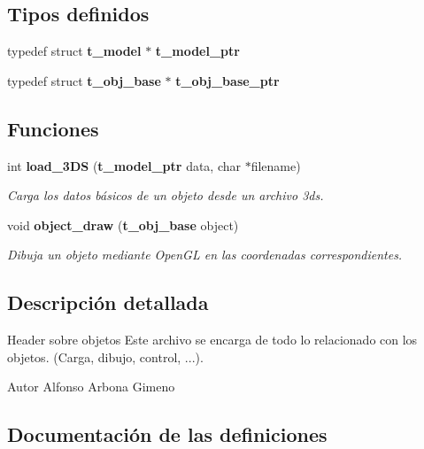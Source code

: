 \subsection*{Tipos definidos}
\begin{DoxyCompactItemize}
\item 
typedef struct {\bf t\_\-model} $\ast$ {\bfseries t\_\-model\_\-ptr}\label{objetos_8h_a6108708a375b94261d76f8f0bf603b79}

\item 
typedef struct {\bf t\_\-obj\_\-base} $\ast$ {\bfseries t\_\-obj\_\-base\_\-ptr}\label{objetos_8h_ab9022bdf7383ef095d59a852a3bd78c2}

\end{DoxyCompactItemize}
\subsection*{Funciones}
\begin{DoxyCompactItemize}
\item 
int {\bf load\_\-3DS} ({\bf t\_\-model\_\-ptr} data, char $\ast$filename)
\begin{DoxyCompactList}\small\item\em Carga los datos básicos de un objeto desde un archivo 3ds. \item\end{DoxyCompactList}\item 
void {\bf object\_\-draw} ({\bf t\_\-obj\_\-base} object)
\begin{DoxyCompactList}\small\item\em Dibuja un objeto mediante OpenGL en las coordenadas correspondientes. \item\end{DoxyCompactList}\end{DoxyCompactItemize}


\subsection{Descripción detallada}
Header sobre objetos Este archivo se encarga de todo lo relacionado con los objetos. (Carga, dibujo, control, ...). \begin{DoxyAuthor}{Autor}
Alfonso Arbona Gimeno 
\end{DoxyAuthor}


\subsection{Documentación de las definiciones}
